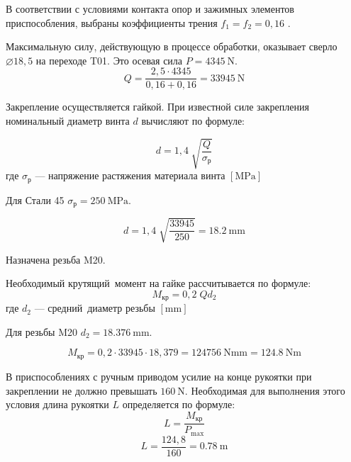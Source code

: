 \documentclass[14pt,russian,a4paper]{extreport}
\begin{document}
В соответствии с условиями контакта опор и зажимных элементов приспособления, выбраны коэффициенты трения $ f_1 = f_2 = 0,16 $ \cite[с.~85, табл.~10]{kosilova:stm2}.

Максимальную силу, действующую в процессе обработки, оказывает сверло $\diameter 18,5$ на переходе T01. Это осевая сила $ P = \SI{4345}{\newton} $.
\begin{equation*}
  Q = \frac{2,5 \cdot 4345}{0,16 + 0,16} = \SI{33945}{\newton}
\end{equation*}

Закрепление осуществляется гайкой. При известной силе закрепления номинальный диаметр винта $d$ вычисляют по формуле:

\begin{equation}
  d = 1,4 \; \sqrt{\frac{Q}{\sigma_\text{р}}}
\end{equation}
где $\sigma_\text{р}$ --- напряжение растяжения материала винта $\left[\si{\mega\pascal}\right]$

Для Стали 45 $ \sigma_\text{р} = \SI{250}{\mega\pascal} $.

\begin{equation*}
  d = 1,4 \; \sqrt{\frac{33945}{250}} = \SI{18,2}{\milli\meter}
\end{equation*}

Назначена резьба M20.

Необходимый крутящий момент на гайке рассчитывается по формуле: \cite[с.~87]{kosilova:stm2}
\begin{equation}
  M_\text{кр} = 0,2 \; Q d_2
\end{equation}
где $d_2$ --- средний диаметр резьбы $\left[\si{\milli\meter}\right]$

Для резьбы M20 $ d_2 = \SI{18,376}{\milli\meter} $.

\begin{equation*}
  M_\text{кр} = 0,2 \cdot 33945 \cdot 18,379 = \SI{124756}{\newton\milli\meter} = \SI{124,8}{\newton\meter}
\end{equation*}

В приспособлениях с ручным приводом усилие на конце рукоятки при закреплении не должно превышать $\SI{160}{\newton}$. Необходимая для выполнения этого условия длина рукоятки $L$ определяется по формуле:
\begin{equation}
  L = \frac{M_\text{кр}}{P_\text{max}}
\end{equation}
\begin{equation*}
  L = \frac{124,8}{160} = \SI{0,78}{\meter}
\end{equation*}
\end{document}
